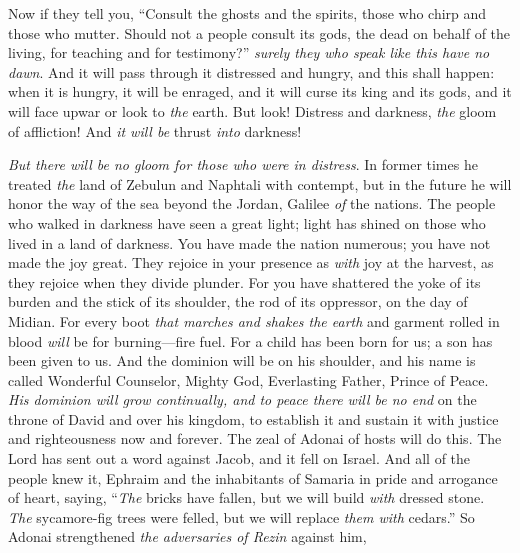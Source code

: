 \begin{biblechapter}
\verse Now if they tell you, “Consult the ghosts and the spirits, those who chirp and those who mutter. Should not a people consult its gods, the dead on behalf of the living,
\verse for teaching and for testimony?” \textit{surely they \textit{who} speak like this have no dawn}.
\verse And it will pass through it distressed and hungry, and this shall happen: when it is hungry, it will be enraged, and it will curse its king and its gods, and it will face upwar
\verse or look to \textit{the} earth. But look! Distress and darkness, \textit{the} gloom of affliction! And \textit{it will be} thrust \textit{into} darkness!
\end{biblechapter}

\begin{biblechapter} %
  \textit{But there will be no gloom for those who were in distress}. In former times he treated \textit{the} land of Zebulun and Naphtali with contempt, but in the future he will honor the way of the sea beyond the Jordan, Galilee \textit{of} the nations.
\verse The people who walked in darkness have seen a great light; 
light has shined on those who lived in a land of darkness.
\verse You have made the nation numerous; 
you have not made the joy great. 
They rejoice in your presence as \textit{with} joy at the harvest, 
as they rejoice when they divide plunder.
\verse For you have shattered the yoke of its burden 
and the stick of its shoulder, 
the rod of its oppressor, on the day of Midian.
\verse For every boot \textit{that marches and shakes the earth} 
and garment rolled in blood 
\textit{will} be for burning—fire fuel.
\verse For a child has been born for us; 
a son has been given to us. 
And the dominion will be on his shoulder, 
and his name is called Wonderful Counselor, Mighty God, 
Everlasting Father, Prince of Peace.
\verse \textit{His dominion will grow continually, 
and to peace there will be no end} 
on the throne of David and over his kingdom, 
to establish it and sustain it 
with justice and righteousness 
now and forever. 
The zeal of Adonai of hosts will do this.
 The Lord has sent out a word against Jacob, 
and it fell on Israel.
\verse And all of the people knew it, 
Ephraim and the inhabitants of Samaria 
in pride and arrogance of heart, saying,
\verse “\textit{The} bricks have fallen, but we will build \textit{with} dressed stone. 
\textit{The} sycamore-fig trees were felled, but we will replace \textit{them with} cedars.”
\verse So Adonai strengthened \textit{the adversaries of Rezin} against him, 

\end{biblechapter}
